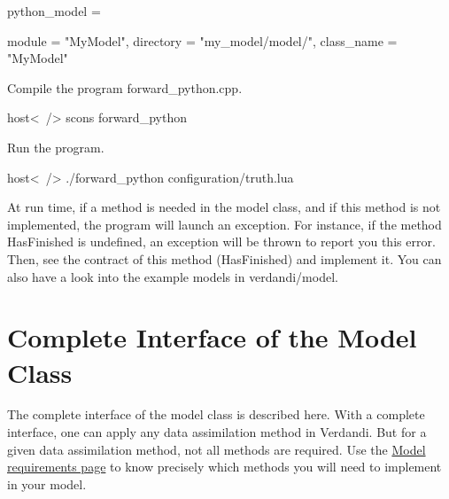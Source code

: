 \documentclass{tufte-book}
\begin{document}
\begin{frame_lua}
python_model = {

   module = "MyModel",
   directory = "my_model/model/",
   class_name = "MyModel"

}
\end{frame_lua}

Compile the program  {\ttfamily forward\_python.cpp}.

\begin{frame_bash}
host<~/> scons forward_python
\end{frame_bash}

Run the program.

\begin{frame_bash}
host<~/> ./forward_python configuration/truth.lua
\end{frame_bash}


At run time, if a method is needed in the model class, and if this method is not implemented, the program will launch an exception. For instance, if the method HasFinished is undefined, an exception will be thrown to report you this error. Then, see the contract of this method (HasFinished) and implement it. You can also have a look into the example models in {\ttfamily verdandi/model}.




\hypertarget{model_template}{
\section{Complete Interface of the Model Class}
\label{model_template}
}

The complete interface of the model class is described here. With a complete interface, one can apply any data assimilation method in Verdandi. But for a given data assimilation method, not all methods are required. Use the \hyperlink{model_requirement_page}{\-Model requirements page} to know precisely which methods you will need to implement in your model.
\end{document}
